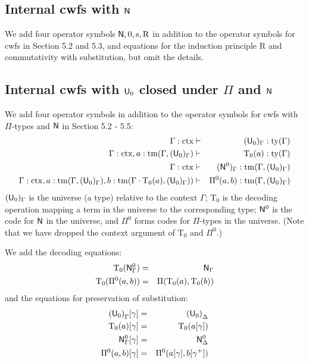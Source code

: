 \documentclass{lmcs}
\newcommand{\s}{\mathrm{s}}
\newcommand{\Rec}{\mathrm{R}}
\newcommand{\Ta}{\mathrm{T}}
\newcommand{\ctx}{\mathrm{ctx}}
\newcommand{\ty}{\mathrm{ty}}
\newcommand{\tm}{\mathrm{tm}}
\begin{document}
\subsection{Internal cwfs with $\mathsf{N}$}
We add four operator symbols $\N, 0, \s, \Rec$  in addition to the operator symbols for cwfs in Section 5.2 and 5.3, and equations for the induction principle $\Rec$ and commutativity with substitution, but omit the details.

\subsection{Internal cwfs with $\mathsf{U}_0$ closed under $\Pi$ and $\mathsf{N}$}\label{sec:u-example}
We add four operator symbols  in addition to the operator symbols for cwfs with $\Pi$-types and $\mathsf{N}$ in Section 5.2 - 5.5:
\begin{eqnarray*}
\Gamma : \ctx &\vdash& (\U_0)_\Gamma : \ty(\Gamma)\\
\Gamma : \ctx, a : \tm(\Gamma,(\U_0)_\Gamma) &\vdash& {\Ta_0}(a) : \ty(\Gamma)\\
\Gamma : \ctx &\vdash& (\N^0)_\Gamma : \tm(\Gamma,(\U_0)_\Gamma) \\
\Gamma : \ctx,
a : \tm(\Gamma,(\U_0)_\Gamma),
b :  \tm(\Gamma \cdot \Ta_0(a), (\U_0)_\Gamma))
&\vdash&
 \Pi^0(a,b) : \tm(\Gamma,(\U_0)_\Gamma)
\end{eqnarray*}
$(\mathsf{U}_0)_\Gamma$ is the universe (a type) relative to the context $\Gamma$; $\Ta_0$ is the decoding operation mapping a term in the universe to the corresponding type; $\mathsf{N}^0$ is the code for $\mathsf{N}$ in the universe, and $\Pi^0$ forms codes for $\Pi$-types in the
 universe. (Note that we have dropped the context argument of $\Ta_0$ and $\Pi^0$.)

We add the decoding equations:
\begin{eqnarray*}
\Ta_0(\N^0_\Gamma) &=& \N_\Gamma\\
\Ta_0(\Pi^0(a,b)) &=& \Pi(\Ta_0(a),\Ta_0(b))
\end{eqnarray*}
and the equations for preservation of substitution:
\begin{eqnarray*}
{(\U_0)}_\Gamma [ \gamma ] &=& {(\U_0)}_\Delta\\
\Ta_0(a) [ \gamma ] &=& \Ta_0(a[ \gamma ] )\\
\N^0_\Gamma [ \gamma ] &=&\N^0_\Delta\\
\Pi^0(a,b)[ \gamma ] &=& \Pi^0(a [ \gamma ], b[ \gamma^+ ])
\end{eqnarray*}
\end{document}
